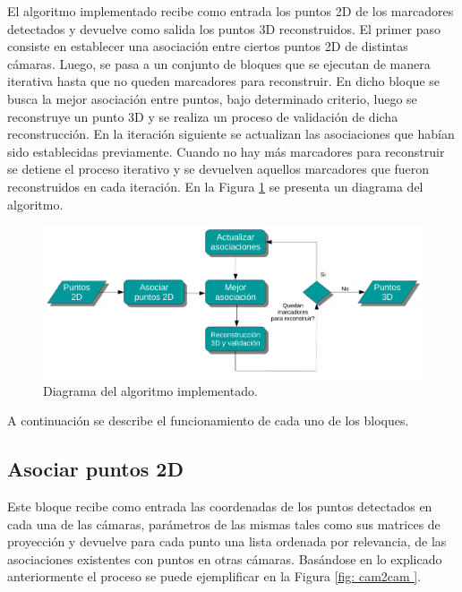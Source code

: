 El algoritmo implementado recibe como entrada los puntos 2D de los marcadores detectados y devuelve como salida los puntos 3D reconstruidos. El primer paso consiste en establecer una asociación entre ciertos puntos 2D de distintas cámaras. Luego, se pasa a un conjunto de bloques que se ejecutan de manera iterativa hasta que no queden marcadores para reconstruir. En dicho bloque se busca la mejor asociación entre puntos, bajo determinado criterio, luego se reconstruye un punto 3D y se realiza un proceso de validación de dicha reconstrucción. En la iteración siguiente se actualizan las asociaciones que habían sido establecidas previamente. Cuando no hay más marcadores para reconstruir se detiene el proceso iterativo y se devuelven aquellos marcadores que fueron reconstruidos en cada iteración. En la Figura \ref{fig: diagrama algoritmo} se presenta un diagrama del algoritmo.\\

\begin{figure}[ht!]
\hspace{-1cm}
\includegraphics[scale=0.55]{img/Reconstruccion/diagrama_algoritmo.pdf}
\caption{Diagrama del algoritmo implementado.}
\label{fig: diagrama algoritmo}
\end{figure}

A continuación se describe el funcionamiento de cada uno de los bloques.

\subsection{Asociar puntos 2D}\label{seccion_asociar2D_uno}

Este bloque recibe como entrada las coordenadas de los puntos detectados en cada una de las cámaras, parámetros de las mismas tales como sus matrices de proyección y devuelve para cada punto una lista ordenada por relevancia, de las asociaciones existentes con puntos en otras cámaras.
Basándose en lo explicado anteriormente el proceso  se puede ejemplificar  en la Figura \ref{fig: cam2cam }.


